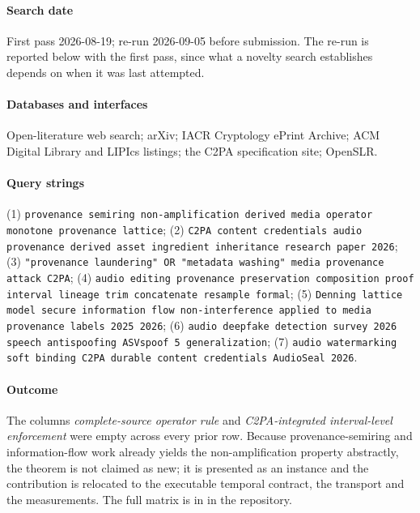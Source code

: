 \documentclass[11pt]{article}
\begin{document}
\paragraph{Search date} First pass 2026-08-19; re-run 2026-09-05 before
submission. The re-run is reported below with the first pass, since what a
novelty search establishes depends on when it was last attempted.

\paragraph{Databases and interfaces} Open-literature web search; arXiv; IACR
Cryptology ePrint Archive; ACM Digital Library and LIPIcs listings; the C2PA
specification site; OpenSLR.

\begingroup
\raggedright
\paragraph{Query strings}
(1) \texttt{provenance semiring non-amplification derived media operator
monotone provenance lattice};
(2) \texttt{C2PA content credentials audio provenance derived asset ingredient
inheritance research paper 2026};
(3) \texttt{"provenance laundering" OR "metadata washing" media provenance
attack C2PA};
(4) \texttt{audio editing provenance preservation composition proof interval
lineage trim concatenate resample formal};
(5) \texttt{Denning lattice model secure information flow non-interference
applied to media provenance labels 2025 2026};
(6) \texttt{audio deepfake detection survey 2026 speech antispoofing ASVspoof 5
generalization};
(7) \texttt{audio watermarking soft binding C2PA durable content credentials
AudioSeal 2026}.
\par\endgroup

\paragraph{Outcome} The columns \emph{complete-source operator rule} and
\emph{C2PA-integrated interval-level enforcement} were empty across every prior
row. Because provenance-semiring and information-flow work already yields the
non-amplification property abstractly, the theorem is not claimed as new; it is
presented as an instance and the contribution is relocated to the executable
temporal contract, the transport and the measurements. The full matrix is in
 in the repository.
\end{document}
